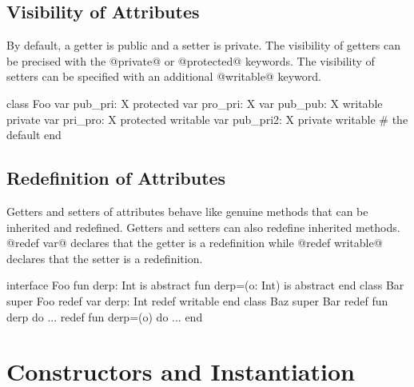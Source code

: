 \subsection{Visibility of Attributes}\label{attribute visibility}

By default, a getter is public and a setter is private.
The visibility of getters can be precised with the @private@ or @protected@ keywords.
The visibility of setters can be specified with an additional @writable@ keyword.

\begin{lst}
class Foo
	var pub_pri: X
	protected var pro_pri: X
	var pub_pub: X writable
	private var pri_pro: X protected writable
	var pub_pri2: X private writable # the default
end
\end{lst}

\subsection{Redefinition of Attributes}\label{redef var}

Getters and setters of attributes behave like genuine methods that can be inherited and redefined.
Getters and setters can also redefine inherited methods.
@redef var@ declares that the getter is a redefinition while @redef writable@ declares that the setter is a redefinition.

\begin{lst}
interface Foo
	fun derp: Int is abstract
	fun derp=(o: Int) is abstract
end
class Bar
	super Foo
	redef var derp: Int redef writable
end
class Baz
	super Bar
	redef fun derp do ...
	redef fun derp=(o) do ...
end
\end{lst}

\section{Constructors and Instantiation}\label{init}


